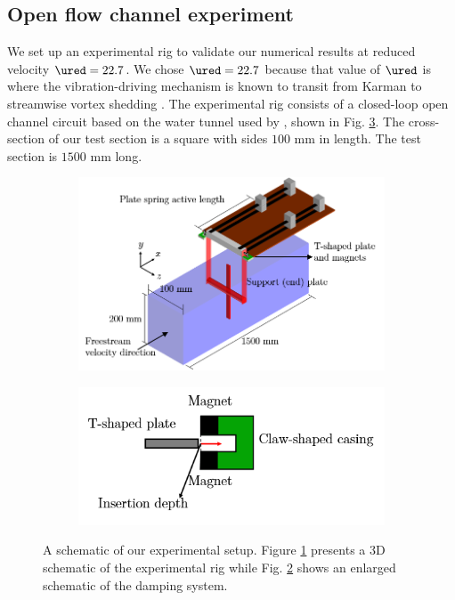 \documentclass[a4paper,fleqn]{cas-sc}
\begin{document}
\subsection{Open flow channel experiment} \label{ssec:openFlowExp}

We set up an experimental rig to validate our numerical results at reduced velocity $\ured = 22.7$. We chose $\ured = 22.7$ because that value of $\ured$ is where the vibration-driving mechanism is known to transit from Karman to streamwise vortex shedding \citep{Koide2013}. The experimental rig consists of a closed-loop open channel circuit based on the water tunnel used by \citet{Nguyen2012}, shown in Fig. \ref{fig:experimentalSetup}. The cross-section of our test section is a square with sides $100$ mm in length. The test section is $1500$ mm long.

\begin{figure}
  \centering
  \begin{subfigure}[h]{0.5\textwidth}
    \includegraphics[width=\textwidth]{figs/figure3a}
    \caption{}
    \label{fig:rigSketch}
  \end{subfigure}

  \begin{subfigure}[h]{0.35\textwidth}
    \includegraphics[width=\textwidth]{figs/figure3b}
    \caption{}
    \label{fig:damperSketch}
  \end{subfigure}

  \caption{A schematic of our experimental setup. Figure \ref{fig:rigSketch} presents a 3D schematic of the experimental rig while Fig. \ref{fig:damperSketch} shows an enlarged schematic of the damping system.} \label{fig:experimentalSetup}
\end{figure}
\end{document}
